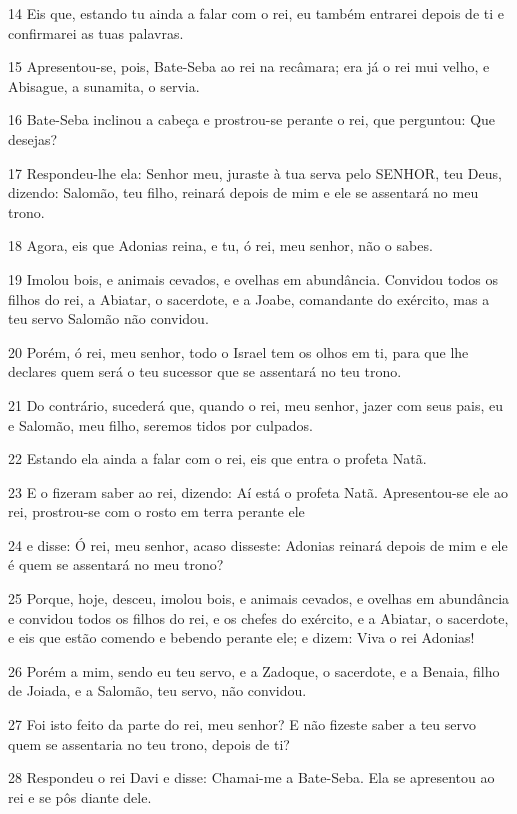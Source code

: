 \par 14 Eis que, estando tu ainda a falar com o rei, eu também entrarei depois de ti e confirmarei as tuas palavras.
\par 15 Apresentou-se, pois, Bate-Seba ao rei na recâmara; era já o rei mui velho, e Abisague, a sunamita, o servia.
\par 16 Bate-Seba inclinou a cabeça e prostrou-se perante o rei, que perguntou: Que desejas?
\par 17 Respondeu-lhe ela: Senhor meu, juraste à tua serva pelo SENHOR, teu Deus, dizendo: Salomão, teu filho, reinará depois de mim e ele se assentará no meu trono.
\par 18 Agora, eis que Adonias reina, e tu, ó rei, meu senhor, não o sabes.
\par 19 Imolou bois, e animais cevados, e ovelhas em abundância. Convidou todos os filhos do rei, a Abiatar, o sacerdote, e a Joabe, comandante do exército, mas a teu servo Salomão não convidou.
\par 20 Porém, ó rei, meu senhor, todo o Israel tem os olhos em ti, para que lhe declares quem será o teu sucessor que se assentará no teu trono.
\par 21 Do contrário, sucederá que, quando o rei, meu senhor, jazer com seus pais, eu e Salomão, meu filho, seremos tidos por culpados.
\par 22 Estando ela ainda a falar com o rei, eis que entra o profeta Natã.
\par 23 E o fizeram saber ao rei, dizendo: Aí está o profeta Natã. Apresentou-se ele ao rei, prostrou-se com o rosto em terra perante ele
\par 24 e disse: Ó rei, meu senhor, acaso disseste: Adonias reinará depois de mim e ele é quem se assentará no meu trono?
\par 25 Porque, hoje, desceu, imolou bois, e animais cevados, e ovelhas em abundância e convidou todos os filhos do rei, e os chefes do exército, e a Abiatar, o sacerdote, e eis que estão comendo e bebendo perante ele; e dizem: Viva o rei Adonias!
\par 26 Porém a mim, sendo eu teu servo, e a Zadoque, o sacerdote, e a Benaia, filho de Joiada, e a Salomão, teu servo, não convidou.
\par 27 Foi isto feito da parte do rei, meu senhor? E não fizeste saber a teu servo quem se assentaria no teu trono, depois de ti?
\par 28 Respondeu o rei Davi e disse: Chamai-me a Bate-Seba. Ela se apresentou ao rei e se pôs diante dele.
